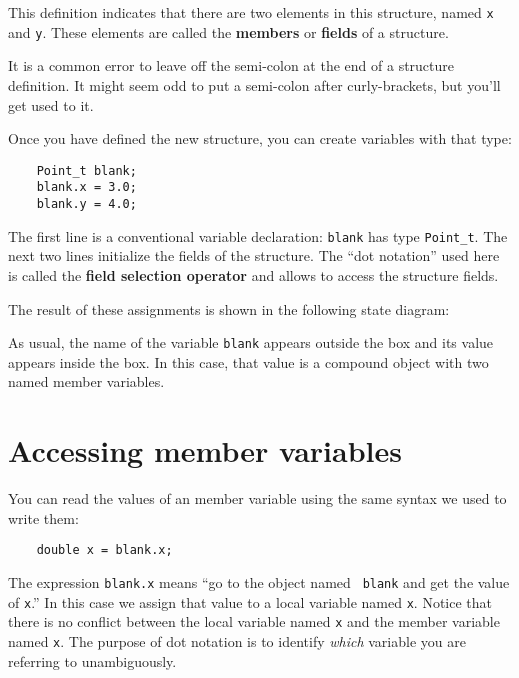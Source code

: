 This definition indicates that there are two elements in this
structure, named {\tt x} and {\tt y}.  These elements are called
the {\bf members} or {\bf fields} of a structure.

It is a common error to leave off the semi-colon at the end of a
structure definition.  It might seem odd to put a semi-colon after
curly-brackets, but you'll get used to it.

Once you have defined the new structure, you can create variables
with that type:

\begin{verbatim}
	Point_t blank;
	blank.x = 3.0;
	blank.y = 4.0;   
\end{verbatim}
%
The first line is a conventional variable declaration: {\tt blank} has
type {\tt Point\_t}.  The next two lines initialize the fields of the
structure.  The ``dot notation'' used here is called the {\bf field selection
	operator} and allows to access the structure fields.


The result of these assignments is shown in the following
state diagram:

\vspace{0.1in}
\centerline{}
\vspace{0.1in}

As usual, the name of the variable {\tt blank} appears outside the box
and its value appears inside the box.  In this case, that value is
a compound object with two named member variables.

\section{Accessing member variables}

You can read the values of an member variable using the same syntax we
used to write them:

\begin{verbatim}
	double x = blank.x;
\end{verbatim}
%
The expression {\tt blank.x} means ``go to the object named {\tt
	blank} and get the value of {\tt x}.''  In this case we assign that
value to a local variable named {\tt x}.  Notice that there is no
conflict between the local variable named {\tt x} and the member
variable named {\tt x}.  The purpose of dot notation is to identify
{\em which} variable you are referring to unambiguously.

